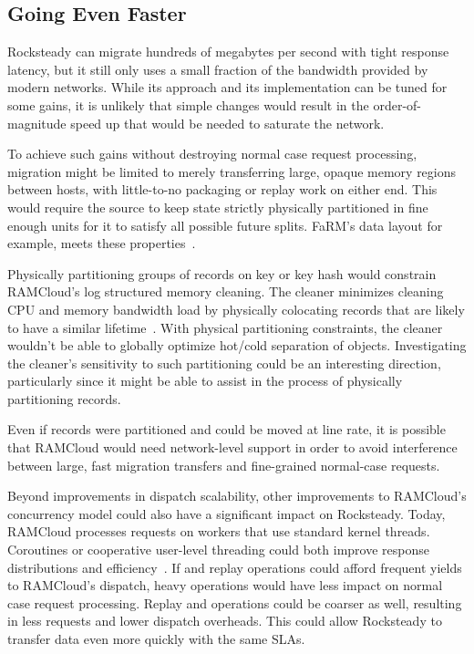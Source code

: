 \subsection{Going Even Faster}

Rocksteady can migrate hundreds of megabytes per second with tight response
latency, but it still only uses a small fraction of the bandwidth provided by
modern networks. While its approach and its implementation can be tuned for
some gains, it is unlikely that simple changes would result in the
order-of-magnitude speed up that would be needed to saturate the network.

To achieve such gains without destroying normal case request processing,
migration might be limited to merely transferring large, opaque memory regions
between hosts, with little-to-no packaging or replay work on either end. This
would require the source to keep state strictly physically partitioned in fine
enough units for it to satisfy all possible future splits. FaRM's data
layout for example, meets these properties~\cite{farm-txns}.

Physically partitioning groups of records on key or key hash would constrain
RAMCloud's log structured memory cleaning. The cleaner minimizes cleaning CPU
and memory bandwidth load by physically colocating records that are likely to
have a similar lifetime~\cite{ramcloud-lsm}.  With physical partitioning constraints, the cleaner
wouldn't be able to globally optimize hot/cold separation of objects.
Investigating the cleaner's sensitivity to such partitioning could be an
interesting direction, particularly since it might be able to assist in the
process of physically partitioning records.

Even if records were partitioned and could be moved at line rate, it is possible
that RAMCloud would need network-level support in order to avoid interference
between large, fast migration transfers and fine-grained normal-case requests.

Beyond improvements in dispatch scalability, other improvements to
RAMCloud's concurrency model could also have a significant impact on
Rocksteady.  Today, RAMCloud processes requests on workers that use standard
kernel threads.  Coroutines or cooperative user-level threading could both
improve response distributions and efficiency~\cite{fasst-2016}. If \pull and replay operations
could afford frequent yields to RAMCloud's dispatch, heavy operations would
have less impact on normal case request processing. Replay and \pull operations
could be coarser as well, resulting in less requests and lower dispatch
overheads. This could allow Rocksteady to transfer data even more quickly with
the same SLAs.

